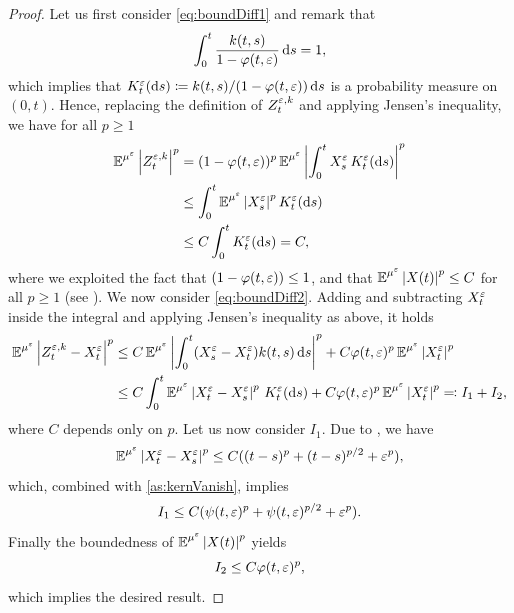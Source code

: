 \documentclass[10pt]{article}
\begin{document}
\begin{proof} Let us first consider \eqref{eq:boundDiff1} and remark that
	\begin{equation}
		\int_0^t \frac{k(t, s)}{1 - \varphi(t, \varepsilon)} \,\mathrm{d} s = 1,
	\end{equation}
	which implies that $K^\varepsilon_t(\mathrm{d} s) \coloneqq k(t, s) / (1 - \varphi(t, \varepsilon)) \,\mathrm{d} s$ is a probability measure on $(0, t)$. Hence, replacing the definition of $Z_t^{\varepsilon, k}$ and applying Jensen's inequality, we have for all $p \geq 1$
	\begin{equation}
	\begin{aligned}
		\operatorname{\mathbb{E}}^{\mu^\varepsilon} \left\lvert Z_t^{\varepsilon, k}\right\rvert^p &= (1 - \varphi(t, \varepsilon))^p \operatorname{\mathbb{E}}^{\mu^\varepsilon} \left\lvert\int_0^t X^\varepsilon_s \, K^\varepsilon_t (\mathrm{d} s)\right\rvert^p\\
		&\leq \int_0^t \operatorname{\mathbb{E}}^{\mu^\varepsilon} \left\lvert X^\varepsilon_s\right\rvert^p K^\varepsilon_t (\mathrm{d} s) \\
		&\leq C\int_0^t  K^\varepsilon_t (\mathrm{d} s) = C,
	\end{aligned}
	\end{equation}
	where we exploited the fact that $(1 - \varphi(t, \varepsilon)) \leq 1$, and that $\operatorname{\mathbb{E}}^{\mu^\varepsilon}\left\lvert X(t)\right\rvert^p \leq C$ for all $p \geq 1$ (see \cite[Corollary 5.4]{PaS07}). We now consider \eqref{eq:boundDiff2}. Adding and subtracting $X_t^\varepsilon$ inside the integral and applying Jensen's inequality as above, it holds
	\begin{equation}
	\begin{aligned}
			\operatorname{\mathbb{E}}^{\mu^\varepsilon} \left\lvert Z_t^{\varepsilon, k} - X_t^\varepsilon\right\rvert^p &\leq C \operatorname{\mathbb{E}}^{\mu^\varepsilon} \left\lvert\int_0^t(X_s^\varepsilon - X_t^\varepsilon) k(t, s) \,\mathrm{d} s\right\rvert^p + C \varphi(t, \varepsilon)^p \operatorname{\mathbb{E}}^{\mu^\varepsilon} \left\lvert X_t^\varepsilon\right\rvert^p\\
			&\leq C \int_0^t \operatorname{\mathbb{E}}^{\mu^\varepsilon} \left\lvert X_t^\varepsilon - X_s^\varepsilon\right\rvert^p \, K_t^\varepsilon(\mathrm{d} s) + C \varphi(t, \varepsilon)^p \operatorname{\mathbb{E}}^{\mu^\varepsilon} \left\lvert X_t^\varepsilon\right\rvert^p \eqqcolon I_1 + I_2,
	\end{aligned}
	\end{equation}
	where $C$ depends only on $p$. Let us now consider $I_1$. Due to \cite[Lemma 6.1]{PaS07}, we have
	\begin{equation}
		\operatorname{\mathbb{E}}^{\mu^\varepsilon} \left\lvert X_t^\varepsilon - X_s^\varepsilon\right\rvert^p \leq C((t-s)^p + (t-s)^{p/2} + \varepsilon^p), 
	\end{equation}
	which, combined with \ref{as:kernVanish}, implies
	\begin{equation}
		I_1 \leq C(\psi(t, \varepsilon)^p + \psi(t, \varepsilon)^{p/2} + \varepsilon^p).
	\end{equation}
	Finally the boundedness of $\operatorname{\mathbb{E}}^{\mu^\varepsilon}\left\lvert X(t)\right\rvert^p$ yields
	\begin{equation}
		I_2 \leq C\varphi(t, \varepsilon)^p,
	\end{equation}
	which implies the desired result.
\end{proof}
\end{document}
